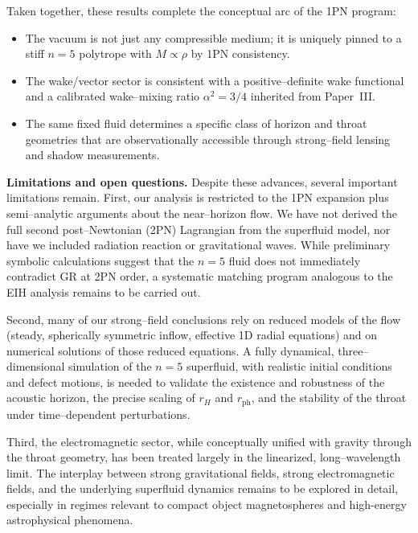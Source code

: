 \documentclass[11pt]{article}
\begin{document}
Taken together, these results complete the conceptual arc of the 1PN
program:
\begin{itemize}
  \item The vacuum is not just any compressible medium; it is uniquely
        pinned to a stiff \(n=5\) polytrope with \(M \propto \rho\) by 1PN
        consistency.
  \item The wake/vector sector is consistent with a positive--definite wake
        functional and a calibrated wake--mixing ratio \(\alpha^2=3/4\)
        inherited from Paper~III.
  \item The same fixed fluid determines a specific class of horizon and
        throat geometries that are observationally accessible through
        strong--field lensing and shadow measurements.
\end{itemize}

\vspace{0.5em}
\noindent\textbf{Limitations and open questions.}
Despite these advances, several important limitations remain.  First, our
analysis is restricted to the 1PN expansion plus semi--analytic arguments
about the near--horizon flow.  We have not derived the full second
post--Newtonian (2PN) Lagrangian from the superfluid model, nor have we
included radiation reaction or gravitational waves.  While preliminary
symbolic calculations suggest that the \(n=5\) fluid does not immediately
contradict GR at 2PN order, a systematic matching program analogous to the
EIH analysis remains to be carried out.

Second, many of our strong--field conclusions rely on reduced models of the
flow (steady, spherically symmetric inflow, effective 1D radial equations)
and on numerical solutions of those reduced equations.  A fully dynamical,
three--dimensional simulation of the \(n=5\) superfluid, with realistic
initial conditions and defect motions, is needed to validate the existence
and robustness of the acoustic horizon, the precise scaling of \(r_H\) and
\(r_{\text{ph}}\), and the stability of the throat under time--dependent
perturbations.

Third, the electromagnetic sector, while conceptually unified with gravity
through the throat geometry, has been treated largely in the linearized,
long--wavelength limit.  The interplay between strong gravitational fields,
strong electromagnetic fields, and the underlying superfluid dynamics
remains to be explored in detail, especially in regimes relevant to compact
object magnetospheres and high-energy astrophysical phenomena.
\end{document}
